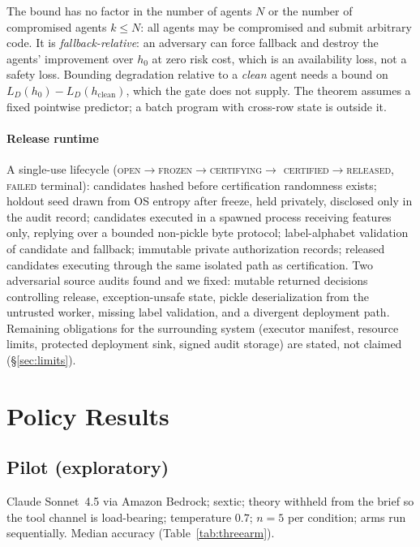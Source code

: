 \documentclass[conference]{IEEEtran}
\newcommand{\risk}[1]{L_D(#1)}
\begin{document}
The bound has no factor in the number of agents $N$ or the number of
compromised agents $k\le N$: all agents may be compromised and submit
arbitrary code. It is \emph{fallback-relative}: an adversary can force
fallback and destroy the agents' improvement over $h_0$ at zero risk
cost, which is an availability loss, not a safety loss. Bounding
degradation relative to a \emph{clean} agent needs a bound on
$\risk{h_0}-\risk{h_{\mathrm{clean}}}$, which the gate does not supply.
The theorem assumes a fixed pointwise predictor; a batch program with
cross-row state is outside it.

\paragraph{Release runtime} A single-use lifecycle
(\textsc{open}$\to$\textsc{frozen}$\to$\textsc{certifying}$\to$
\textsc{certified}$\to$\textsc{released}, \textsc{failed} terminal):
candidates hashed before certification randomness exists; holdout seed
drawn from OS entropy after freeze, held privately, disclosed only in
the audit record; candidates executed in a spawned process receiving
features only, replying over a bounded non-pickle byte protocol;
label-alphabet validation of candidate and fallback; immutable private
authorization records; released candidates executing through the same
isolated path as certification. Two adversarial source audits found
and we fixed: mutable returned decisions controlling release,
exception-unsafe state, pickle deserialization from the untrusted
worker, missing label validation, and a divergent deployment path.
Remaining obligations for the surrounding system (executor manifest,
resource limits, protected deployment sink, signed audit storage) are
stated, not claimed (\S\ref{sec:limits}).

\section{Policy Results}\label{sec:policy}

\subsection{Pilot (exploratory)}

Claude Sonnet~4.5 via Amazon Bedrock; sextic; theory withheld from
the brief so the tool channel is load-bearing; temperature $0.7$;
$n=5$ per condition; arms run sequentially. Median accuracy
(Table~\ref{tab:threearm}).
\end{document}
